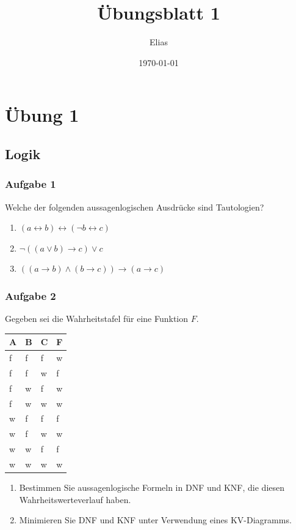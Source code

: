 \documentclass[a4paper,14pt,ngerman]{scrartcl}
\author{Elias}
\date{\today}
\title{Übungsblatt 1}
\begin{document}
\section{\textbf{Übung 1}}
\label{sec:orgd1ceeb3}
\subsection{\textbf{Logik}}
\label{sec:org0102367}
\subsubsection{\textbf{Aufgabe 1}}
\label{sec:orgcd61ea2}

Welche der folgenden aussagenlogischen Ausdrücke sind Tautologien?

\begin{enumerate}
\item \((a \leftrightarrow b) \leftrightarrow (\neg b \leftrightarrow c)\)

\item \(\neg ((a \lor b) \rightarrow c) \lor c\)

\item \(((a \rightarrow b) \land (b \rightarrow c)) \rightarrow (a \rightarrow c)\)
\end{enumerate}
\subsubsection{\textbf{Aufgabe 2}}
\label{sec:orgfddd82b}

Gegeben sei die Wahrheitstafel für eine Funktion \(F\).

\begin{center}
\begin{tabular}{llll}
A & B & C & F\\
\hline
f & f & f & w\\
f & f & w & f\\
f & w & f & w\\
f & w & w & w\\
w & f & f & f\\
w & f & w & w\\
w & w & f & f\\
w & w & w & w\\
\end{tabular}
\end{center}

\begin{enumerate}
\item Bestimmen Sie aussagenlogische Formeln in DNF und KNF, die diesen
Wahrheitswerteverlauf haben.

\item Minimieren Sie DNF und KNF unter Verwendung eines KV-Diagramms.
\end{enumerate}
\end{document}
